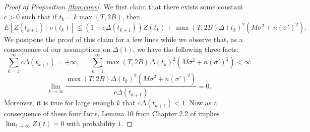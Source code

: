 \documentclass[final]{siamltex}
\begin{document}
\begin{proof}[Proof of {{{Proposition}}} \ref{thm:conv}]  We first claim that there exists some constant $c>0$ such that if $t_k=k \max(T,2B)$, then
\begin{equation} \label{constantdecay}  E[Z({{{t_{k+1}}}}) ~|~ v(t_k)] \leq (1- c \Delta(t_{k+1})) Z({{{t_k}}}) +  \max(T,2B) \Delta(t_k)^2 {{{( M \sigma^2 + n (\sigma')^2)}}}. \end{equation} 
{{{We postpone the proof of this claim for a few lines while we observe that,}}} as a consequence of our assumptions on $\Delta(t)$, we have the following three facts: 
\[ \sum_{k=1}^{\infty} c \Delta(t_{k+1}) = +\infty, ~~~~~~~\sum_{k=1}^{\infty}  \max(T,2B) \Delta(t_k)^2 {{{( M \sigma^2 + n (\sigma')^2)}}} < \infty \] \[ \lim_{{{{k}}} \rightarrow \infty} \frac{ \max(T,2B) \Delta(t_k)^2 {{{( M \sigma^2 + n (\sigma')^2)}}}}{c \Delta(t_{k+1})} = 0. \] Moreover, it is true for large enough $k$ that $c \Delta( t_{k+1} ) < 1$. {{{Now as a consequence of these four facts, Lemma 10 from Chapter 2.2 of \cite{p87}}}} implies $\lim_{t \rightarrow \infty} Z({{{t}}})=0$ with probability $1$. 


\end{proof}
\end{document}
